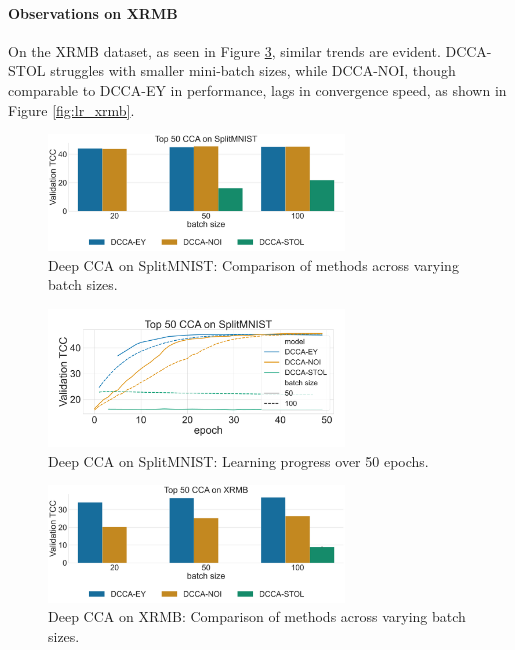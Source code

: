 \paragraph{Observations on XRMB}
On the XRMB dataset, as seen in Figure \ref{fig:corr_xrmb}, similar trends are evident. DCCA-STOL struggles with smaller mini-batch sizes, while DCCA-NOI, though comparable to DCCA-EY in performance, lags in convergence speed, as shown in Figure \ref{fig:lr_xrmb}.

\begin{figure}
    \centering
    \includegraphics[width=0.7\textwidth]{figures/DCCA/SplitMNIST_models_different_batch_sizes}
    \caption{Deep CCA on SplitMNIST: Comparison of methods across varying batch sizes.}
    \label{fig:corr_mnist}
\end{figure}

\begin{figure}
    \centering
    \includegraphics[width=0.7\textwidth]{figures/DCCA/SplitMNIST_allbatchsizes_pcc}
    \caption{Deep CCA on SplitMNIST: Learning progress over 50 epochs.}
    \label{fig:lr_mnist}
\end{figure}

\begin{figure}
    \centering
    \includegraphics[width=0.7\textwidth]{figures/DCCA/XRMB_models_different_batch_sizes}
    \caption{Deep CCA on XRMB: Comparison of methods across varying batch sizes.}
    \label{fig:corr_xrmb}
\end{figure}

